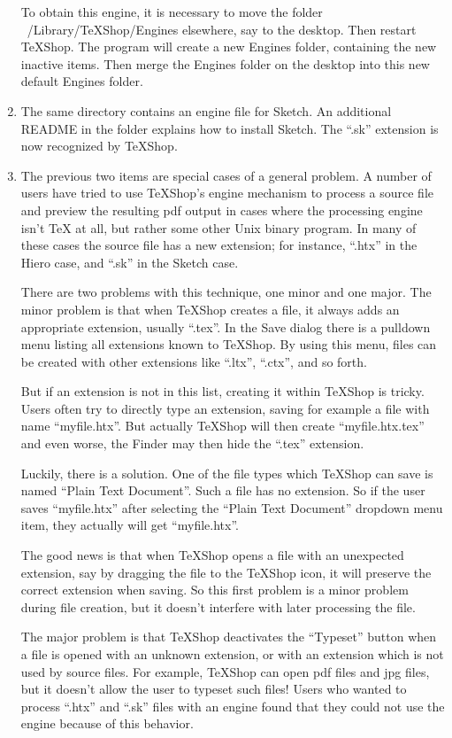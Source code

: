 \documentclass[11pt, oneside]{amsart}
\begin{document}
\begin{enumerate}
To obtain this engine, it is necessary to move the folder ~/Library/TeXShop/Engines elsewhere, say to the desktop. Then restart TeXShop. The program will create a new Engines folder, containing the new inactive items. Then merge the Engines folder on the desktop into this new default Engines folder.

 \item The same directory contains an engine file for Sketch. An additional README in the folder explains how to install Sketch. The ``.sk'' extension is now recognized by TeXShop.
 
 \item The previous two items are special cases of a general problem. A number of users have tried to use TeXShop's engine mechanism to process a source file and preview the resulting pdf output in cases where the processing engine isn't TeX at all, but rather some other Unix binary program.  In many of these cases the source file has a new extension; for instance, ``.htx'' in the Hiero case, and ``.sk'' in the Sketch case. 
 
 There are two problems with this technique, one minor and one major. The minor problem is that when TeXShop creates a file, it always adds an appropriate extension, usually ``.tex''. In the Save dialog there is a pulldown menu listing all extensions known to TeXShop. By using this menu, files can be created with other extensions like ``.ltx'', ``.ctx'', and so forth. 
 
 But if an extension is not in this list, creating it within TeXShop is tricky. Users often try to directly type an extension, saving for example a file with name ``myfile.htx''. But actually TeXShop will then create ``myfile.htx.tex'' and even worse, the Finder may then hide the ``.tex'' extension.
 
 Luckily, there is a solution. One of the file types which TeXShop can save is named ``Plain Text Document''. Such a file has no extension. So if the user saves ``myfile.htx'' after selecting the ``Plain Text Document'' dropdown menu item, they actually will get ``myfile.htx''.
 
The good news is that when TeXShop opens a file with an unexpected extension, say by dragging the file to the TeXShop icon, it will preserve the correct extension when saving. So this first problem is a minor problem during file creation, but it doesn't interfere with later processing the file.

The major problem is that TeXShop deactivates the ``Typeset'' button when a file is opened with an unknown extension, or with an extension which is not used by source files. For example, TeXShop can open pdf files and jpg files, but it doesn't allow the user to typeset such files!
Users who wanted to process ``.htx'' and ``.sk'' files with an engine found that they could not use the engine because of this behavior.


\end{enumerate}
\end{document}
